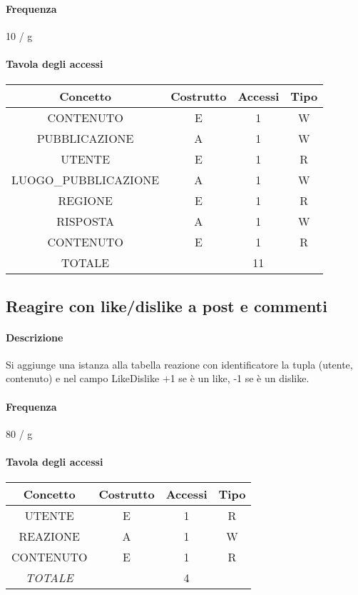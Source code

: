 \documentclass[a4paper,12pt]{report}
\begin{document}
\paragraph{Frequenza} 10 / g
\begin{table}[t]
\paragraph{Tavola degli accessi\newline}
\begin{tabular}{|c|c|c|c|}
\hline
Concetto             & Costrutto & Accessi & Tipo \\ \hline
CONTENUTO            & E         & 1       & W    \\ \hline
PUBBLICAZIONE        & A         & 1       & W    \\ \hline
UTENTE               & E         & 1       & R    \\ \hline
LUOGO\_PUBBLICAZIONE & A         & 1       & W    \\ \hline
REGIONE              & E         & 1       & R    \\ \hline
RISPOSTA             & A         & 1       & W    \\ \hline
CONTENUTO            & E         & 1       & R    \\ \hline
TOTALE               &           & 11      &      \\ \hline
\end{tabular}
\end{table}
\subsection{Reagire con like/dislike a post e commenti} \label{like}
\paragraph{Descrizione} Si aggiunge una istanza alla tabella reazione con identificatore la tupla (utente, contenuto) e nel campo LikeDislike +1 se è un like, -1 se è un dislike.
\paragraph{Frequenza} 80 / g
\begin{table}[h]
\paragraph{Tavola degli accessi\newline}
\begin{tabular}{|c|c|c|c|}
\hline
Concetto        & Costrutto & Accessi & Tipo \\ \hline
UTENTE          & E         & 1       & R    \\ \hline
REAZIONE        & A         & 1       & W    \\ \hline
CONTENUTO       & E         & 1       & R    \\ \hline
\textit{TOTALE} &           & 4       &      \\ \hline
\end{tabular}
\end{table}
\end{document}
